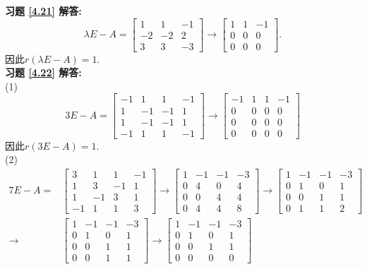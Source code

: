 \textbf{习题 \ref{4.21} 解答:}\\
$$\lambda E-A=\begin{bmatrix}1&1&-1\\-2&-2&2\\3&3&-3\end{bmatrix}\rightarrow\begin{bmatrix}1&1&-1\\0&0&0\\0&0&0\end{bmatrix}.$$ 因此$r(\lambda E-A)=1$.\\
\textbf{习题 \ref{4.22} 解答:}\\
(1) $$3E-A=\begin{bmatrix}-1&1&1&-1\\1&-1&-1&1\\1&-1&-1&1\\-1&1&1&-1\end{bmatrix}\rightarrow \begin{bmatrix}-1&1&1&-1\\0&0&0&0\\0&0&0&0\\0&0&0&0\end{bmatrix}$$
因此$r(3E-A)=1.$\\
(2)\begin{displaymath}\begin{aligned}7E-A=&\begin{bmatrix}3&1&1&-1\\1&3&-1&1\\1&-1&3&1\\-1&1&1&3\end{bmatrix}
\rightarrow \begin{bmatrix}1&-1&-1&-3\\0&4&0&4\\0&0&4&4\\0&4&4&8\end{bmatrix}
\rightarrow  \begin{bmatrix}1&-1&-1&-3\\0&1&0&1\\0&0&1&1\\0&1&1&2\end{bmatrix}\\
\rightarrow & \begin{bmatrix}1&-1&-1&-3\\0&1&0&1\\0&0&1&1\\0&0&1&1\end{bmatrix}
\rightarrow  \begin{bmatrix}1&-1&-1&-3\\0&1&0&1\\0&0&1&1\\0&0&0&0\end{bmatrix}
\end{aligned}\end{displaymath}
